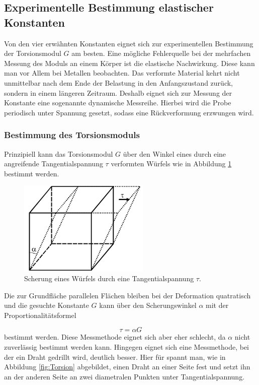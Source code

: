 \subsection{Experimentelle Bestimmung elastischer Konstanten}

Von den vier erwähnten Konstanten eignet sich zur experimentellen Bestimmung
der Torsionsmodul $G$ am besten.
Eine mögliche Fehlerquelle bei der mehrfachen Messung des Moduls an einem
Körper ist die elastische Nachwirkung. Diese kann man vor Allem bei Metallen
beobachten. Das verformte Material kehrt nicht unmittelbar nach dem Ende der
Belastung in den Anfangszustand zurück, sondern in einem längeren Zeitraum.
Deshalb eignet sich zur Messung der Konstante eine sogenannte dynamische
Messreihe. Hierbei wird die Probe periodisch unter Spannung gesetzt, sodass
eine Rückverformung erzwungen wird.


\subsubsection{Bestimmung des Torsionsmoduls}

Prinzipiell kann das Torsionsmodul $G$ über den Winkel eines
durch eine angreifende Tangentialspannung $\tau$ verformten Würfels
wie in Abbildung \ref{fig:WurfelScher} bestimmt werden.

\newpage

\begin{figure}[h]
  \centering
  \includegraphics[height=4.5cm]{ScherungWuerfel.png}
  \caption{Scherung eines Würfels durch eine Tangentialspannung $\tau$.}
  \label{fig:WurfelScher}
\end{figure}

Die zur Grundfläche parallelen Flächen bleiben bei der Deformation quatratisch
und die gesuchte Konstante $G$ kann über den Scherungswinkel $\alpha$ mit der
Proportionalitätsformel

\begin{equation}
  \tau = \alpha G
  \label{eqn:Scherung}
\end{equation}
bestimmt werden.
Diese Messmethode eignet sich aber eher schlecht, da $\alpha$ nicht zuverlässig
bestimmt werden kann.
Hingegen eignet sich eine Messmethode, bei der ein Draht gedrillt
wird, deutlich besser. Hier für spannt man, wie in Abbildung \ref{fig:Torsion}
abgebildet, einen Draht an einer Seite fest und setzt ihn an der anderen Seite
an zwei diametralen Punkten unter Tangentialspannung.


